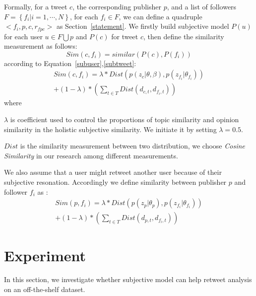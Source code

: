 \documentclass{acm_proc_article-sp}
\begin{document}
Formally, for a tweet $ c $, the corresponding publisher $ p $, and a list of followers $ F= \left\lbrace f_{i} \vert i=1, \cdots, N \right\rbrace  $, for each $ f_{i} \in F $, we can define a quadruple $ < f_{i}, p, c, r_{fpc} >  $ as Section~\ref{statement}.
We firstly build subjective model $ P\left( u \right)  $ for each user $ u \in F \bigcup p $ and $ P\left( c \right)  $ for tweet $ c $, then define the similarity measurement as follows:
\begin{equation}
Sim\left( c,f_{i} \right) = similar\left( P\left( c \right), P\left( f_{i} \right) \right)
\end{equation}
according to Equation~\ref{subuser},\ref{subtweet}:
\begin{equation}
\label{tweetfollower}
\begin{split}
Sim\left( c,f_{i} \right) = \lambda \ast Dist\left( p\left( z_{c} \vert \theta, \beta \right), p\left( z_{f_{i}} \vert \theta_{f_{i}} \right) \right) \\
+\left(1-\lambda \right) \ast \left( \sum_{t \in T} Dist \left( d_{c,t}, d_{f_{i}, t} \right)  \right)
\end{split}
\end{equation}
where 
\begin{itemize*}
\item $ \lambda $ is coefficient used to control the proportions of topic similarity and opinion similarity in the holistic subjective similarity. We initiate it by setting $ \lambda =0.5 $. 
\item $ Dist $ is the similarity measurement between two distribution, we choose \emph{Cosine Similarity } in our research among different measurements.
\end{itemize*}
We also assume that a user might retweet another user because of their subjective resonation. Accordingly we define similarity between publisher $ p $ and follower $ f_{i} $ as :
\begin{equation}
\label{pubfollower}
\begin{split}
Sim\left( p,f_{i} \right) = \lambda \ast Dist\left( p\left( z_{p} \vert \theta_{p} \right), p\left( z_{f_{i}} \vert \theta_{f_{i}} \right) \right) \\
+\left(1-\lambda \right) \ast \left( \sum_{t \in T} Dist \left( d_{p,t}, d_{f_{i}, t} \right)  \right)
\end{split}
\end{equation}

\section{Experiment}
\label{experiment}
In this section, we investigate whether subjective model can help retweet analysis on an off-the-shelf dataset. 
\end{document}
